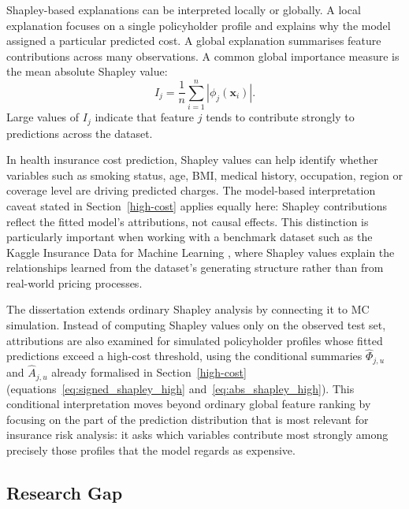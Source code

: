 \noindent
Shapley-based explanations can be interpreted locally or globally. A local explanation focuses on a single policyholder profile and explains why the model assigned a particular predicted cost. A global explanation summarises feature contributions across many observations. A common global importance measure is the mean absolute Shapley value:
\[
I_j
=
\frac{1}{n}
\sum_{i=1}^{n}
|\phi_j(\mathbf{x}_i)|.
\]
Large values of \(I_j\) indicate that feature \(j\) tends to contribute strongly to predictions across the dataset.

\noindent
In health insurance cost prediction, Shapley values can help identify whether variables such as smoking status, age, BMI, medical history, occupation, region or coverage level are driving predicted charges. The model-based interpretation caveat stated in Section~\ref{high-cost} applies equally here: Shapley contributions reflect the fitted model's attributions, not causal effects. This distinction is particularly important when working with a benchmark dataset such as the Kaggle Insurance Data for Machine Learning \citep{kaggleInsuranceDataML}, where Shapley values explain the relationships learned from the dataset's generating structure rather than from real-world pricing processes.

\noindent
The dissertation extends ordinary Shapley analysis by connecting it to
MC simulation.  Instead of computing Shapley values only on the
observed test set, attributions are also examined for simulated
policyholder profiles whose fitted predictions exceed a high-cost
threshold, using the conditional summaries \(\widehat{\Phi}_{j,u}\)
and \(\widehat{A}_{j,u}\) already formalised in
Section~\ref{high-cost}
(equations~\eqref{eq:signed_shapley_high}
and~\eqref{eq:abs_shapley_high}).  This conditional interpretation
moves beyond ordinary global feature ranking by focusing on the part of
the prediction distribution that is most relevant for insurance risk
analysis: it asks which variables contribute most strongly among
precisely those profiles that the model regards as expensive.



\subsection{Research Gap}
\label{sec:research_gap}

